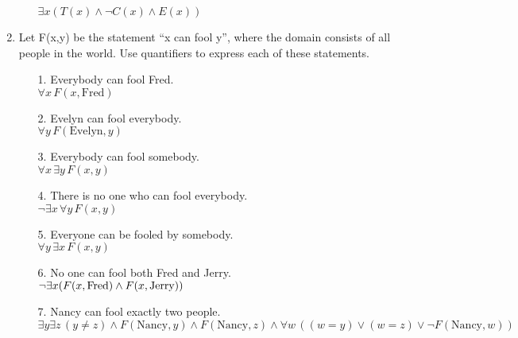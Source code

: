 \documentclass[11pt]{article}
\begin{document}
\begin{enumerate}
\begin{enumerate}
 $ \exists x (T(x)\land \neg C(x) \land E(x))$\\

  
  \end{enumerate}

\newpage
\item Let F(x,y) be the statement “x can fool y”, where the domain consists of all people in the world. Use quantifiers to express each of these statements.

  
  \begin{enumerate}
  \item[1.]Everybody can fool Fred.\\
  
    $\forall x \, F(x, \text{Fred})$

  \item[2.] Evelyn can fool everybody.\\
  
  $\forall y \, F(\text{Evelyn}, y)$\\

  \item[3.] Everybody can fool somebody.\\
  
  $\forall x \, \exists y \, F(x, y)$\\

  \item[4.] There is no one who can fool everybody.\\
  
  $\neg \exists x \, \forall y \, F(x,y)$\\

  \item[5.] Everyone can be fooled by somebody.\\
  
  $\forall y \, \exists x \, F(x, y)$\\

  \item[6.] No one can fool both Fred and Jerry.\\
  
  $\neg \exists x (F(x, \text{Fred}) \land F(x, \text{Jerry}))\\$

  \item[7.] Nancy can fool exactly two people.\\
  
$\exists y \exists z \, (y \neq z) \land F(\text{Nancy},y) \land F(\text{Nancy},z) \land \forall w \, ((w = y) \lor (w = z) \lor \neg F(\text{Nancy},w))$\\


\end{enumerate}
\end{enumerate}
\end{document}
